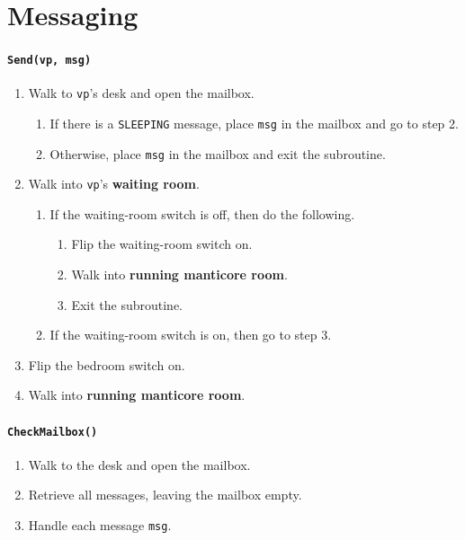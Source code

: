 \documentclass[11pt]{article}
\begin{document}
\section{Messaging}

\paragraph{\texttt{Send(vp, msg)}}
\begin{enumerate}
  \item Walk to \texttt{vp}'s desk and open the mailbox.
    \begin{enumerate}
      \item If there is a \texttt{SLEEPING} message, place \texttt{msg} in the mailbox and go to step 2.
      \item Otherwise, place \texttt{msg} in the mailbox and exit the subroutine.
    \end{enumerate}
  \item Walk into \texttt{vp}'s \textbf{waiting room}.
    \begin{enumerate}
      \item If the waiting-room switch is off, then do the following.
        \begin{enumerate}
          \item Flip the waiting-room switch on.
          \item Walk into \textbf{running manticore room}.
          \item Exit the subroutine.
        \end{enumerate}
      \item If the waiting-room switch is on, then go to step 3.
    \end{enumerate}
  \item Flip the bedroom switch on.
  \item Walk into \textbf{running manticore room}.
\end{enumerate}

\paragraph{\texttt{CheckMailbox()}}

\begin{enumerate}
  \item Walk to the desk and open the mailbox.
  \item Retrieve all messages, leaving the mailbox empty.
  \item Handle each message \texttt{msg}.
\end{enumerate}
\end{document}
